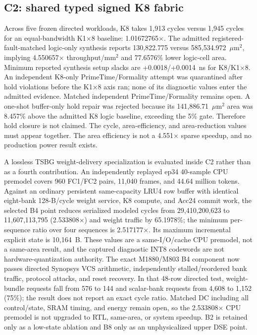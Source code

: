 \documentclass[9pt,twocolumn]{article}
\begin{document}
\subsection{C2: shared typed signed K8 fabric}
Across five frozen directed workloads, K8 takes 1,913 cycles versus 1,945 cycles
for an equal-bandwidth K1$\times$8 baseline: 1.01672765$\times$.  The admitted
registered-fault-matched logic-only synthesis reports 130,822.775 versus
585,534.972~$\mu$m$^2$, implying 4.550657$\times$ throughput/mm$^2$ and
77.6576\% lower logic-cell area.  Minimum reported synthesis setup slacks are
+0.0018/+0.0014~ns for K8/K1$\times$8.  An independent K8-only
PrimeTime/Formality attempt was quarantined after hold violations before the
K1$\times$8 axis ran; none of its diagnostic values enter the admitted
evidence.  Matched independent PrimeTime/Formality remains open.  A one-shot
buffer-only hold repair was rejected because its 141,886.71~$\mu$m$^2$ area was
8.457\% above the admitted K8 logic baseline, exceeding the 5\% gate.  Therefore
hold closure is not claimed.  The cycle, area-efficiency,
and area-reduction values must appear together.  The area efficiency is not a
4.551$\times$ sparse speedup, and no production power result exists.

A lossless TSBG weight-delivery specialization is evaluated inside C2 rather
than as a fourth contribution.  An independently replayed ep34 40-sample CPU
premodel covers 960 FC1/FC2 pairs, 11,040 frames, and 44.64 million tokens.
Against an ordinary persistent same-capacity LRU4 row buffer with identical
eight-bank 128-B/cycle weight service, K8 compute, and Acc24 commit work, the
selected B4 point reduces serialized modeled cycles from 29,410,200,623 to
11,607,113,795 (2.533808$\times$) and weight traffic by 65.1978\%; the minimum
per-sequence ratio over four sequences is 2.517177$\times$.  Its maximum
incremental explicit state is 10,164~B.  These values are a same-I/O/cache CPU
premodel, not a same-area result, and the captured diagnostic INT8 codewords are
not hardware-quantization authority.  The exact M1880/M803 B4 component now
passes directed Synopsys VCS arithmetic, independently stalled/reordered bank
traffic, protocol attacks, and reset recovery.  In that 48-row directed test,
weight-bundle requests fall from 576 to 144 and scalar-bank requests from 4,608
to 1,152 (75\%); the result does not report an exact cycle ratio.  Matched DC
including all control/state, SRAM timing, and energy remain open, so the
2.533808$\times$ CPU premodel is not upgraded to RTL, same-area, or system
speedup.  B2 is retained only as a low-state ablation and B8 only as an
unphysicalized upper DSE point.
\end{document}
